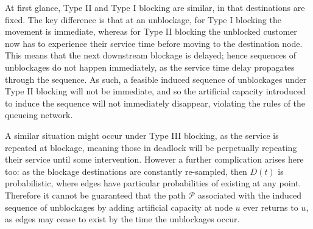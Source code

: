 \documentclass{article}
\begin{document}
At first glance, Type II and Type I blocking are similar, in that destinations
are fixed.
The key difference is that at an unblockage, for Type I blocking the movement is
immediate, whereas for Type II blocking the unblocked customer now has to
experience their service time before moving to the destination node.
This means that the next downstream blockage is delayed; hence sequences of
unblockages do not happen immediately, as the service time delay propagates
through the sequence.
As such, a feasible induced sequence of unblockages under Type II blocking will
not be immediate, and so the artificial capacity introduced to induce the
sequence will not immediately disappear, violating the rules of the queueing
network.

A similar situation might occur under Type III blocking, as the service is
repeated at blockage, meaning those in deadlock will be perpetually repeating
their service until some intervention.
However a further complication arises here too: as the blockage destinations are
constantly re-sampled, then $D(t)$ is probabilistic, where edges have particular
probabilities of existing at any point.
Therefore it cannot be guaranteed that the path $\mathcal{P}$ associated with
the induced sequence of unblockages by adding artificial capacity at node $u$
ever returns to $u$, as edges may cease to exist by the time the unblockages
occur.




\end{document}
